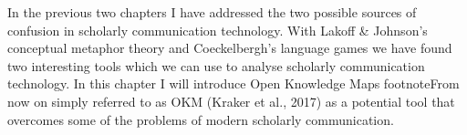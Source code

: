 In the previous two chapters I have addressed the two possible sources of confusion in scholarly communication technology. With Lakoff & Johnson’s conceptual metaphor theory and Coeckelbergh’s language games we have found two interesting tools which we can use to analyse scholarly communication technology. In this chapter I will introduce Open Knowledge Maps footnote{From now on simply referred to as OKM }(Kraker et al., 2017) as a potential tool that overcomes some of the problems of modern scholarly communication.

